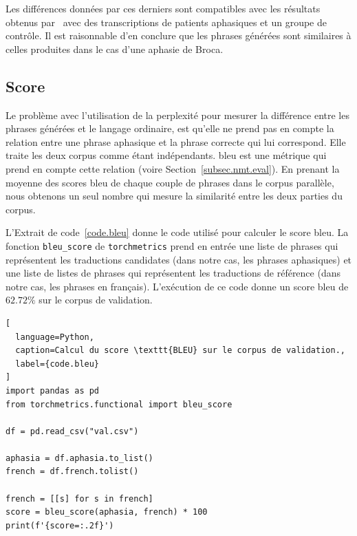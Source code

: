 Les différences données par ces derniers sont compatibles avec les résultats obtenus 
par~\cite{ghumman2021training} avec des transcriptions de patients aphasiques et un groupe de contrôle.
Il est raisonnable d'en conclure que les phrases générées sont similaires 
à celles produites dans le cas d'une aphasie de Broca.

\subsection{Score }%
\label{subsec.results.corpus.bleu}

Le problème avec l'utilisation de la perplexité pour mesurer 
la différence entre les phrases générées et le langage ordinaire,
est qu'elle ne prend pas en compte la relation entre une phrase aphasique et la phrase correcte qui lui correspond. 
Elle traite les deux corpus comme étant indépendants.
\gls{bleu} est une métrique qui prend en compte cette relation (voire Section~\ref{subsec.nmt.eval}).
En prenant la moyenne des scores \gls{bleu} de chaque couple de phrases dans le corpus parallèle,
nous obtenons un seul nombre qui mesure la similarité entre les deux parties du corpus.

L'Extrait de code~\ref{code.bleu} donne le code utilisé pour calculer le score \gls{bleu}.
La fonction \verb|bleu_score| de \verb|torchmetrics| prend en entrée 
une liste de phrases qui représentent les traductions candidates (dans notre cas, les phrases aphasiques)
et une liste de listes de phrases qui représentent les traductions de référence (dans notre cas, les phrases en français).
L'exécution de ce code donne un score \gls{bleu} de \(62.72\%\) sur le corpus de validation.
\begin{lstlisting}[
  language=Python,
  caption=Calcul du score \texttt{BLEU} sur le corpus de validation.,
  label={code.bleu}
]
import pandas as pd
from torchmetrics.functional import bleu_score

df = pd.read_csv("val.csv")

aphasia = df.aphasia.to_list()
french = df.french.tolist()

french = [[s] for s in french]
score = bleu_score(aphasia, french) * 100
print(f'{score=:.2f}')
\end{lstlisting}
